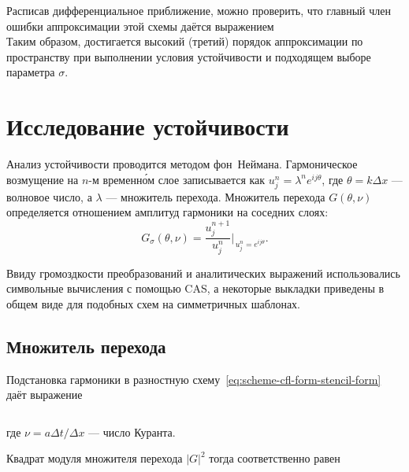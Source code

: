 \documentclass[12pt]{article}
\begin{document}
Расписав дифференциальное приближение, можно проверить, что главный член ошибки аппроксимации этой схемы даётся выражением
\begin{equation}

\label{eq:principal-error-term}
\end{equation}
Таким образом, достигается высокий (третий) порядок аппроксимации по пространству при выполнении условия устойчивости и подходящем выборе параметра $\sigma$.

\section{Исследование устойчивости}
\label{sec:stability-analysis}

Анализ устойчивости проводится методом фон~Неймана. Гармоническое возмущение на $n$-м временн\'{о}м слое записывается как $u_j^n = \lambda^n e^{i j\theta}$, где $\theta = k\Delta x$ — волновое число, а $\lambda$ — множитель перехода. Множитель перехода $G(\theta,\nu)$ определяется отношением амплитуд гармоники на соседних слоях:
\begin{equation}
G_{\sigma}(\theta, \nu) = \frac{u_j^{n+1}}{u_j^n}\Big|_{\,u_j^n = e^{i j\theta}}.
\end{equation}

Ввиду громоздкости преобразований и аналитических выражений использовались символьные вычисления с помощью CAS, а некоторые выкладки приведены в общем виде для подобных схем на симметричных шаблонах.

\subsection{Множитель перехода}
Подстановка гармоники в разностную схему~\eqref{eq:scheme-cfl-form-stencil-form} даёт выражение

% 

\begin{dmath}

\label{eq:amplification-factor}
\end{dmath}

где $\nu = a\Delta t/\Delta x$ — число Куранта.

Квадрат модуля множителя перехода $|G|^2$ тогда соответственно равен
\begin{dmath}

\label{eq:amplification-factor-mod-squared}
\end{dmath}
\end{document}
